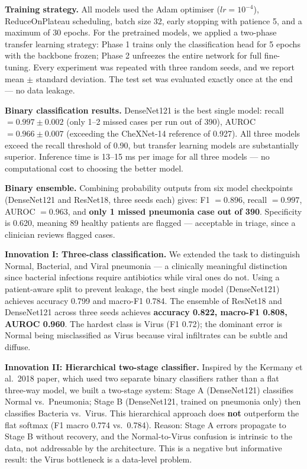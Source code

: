 \documentclass[12pt,a4paper]{article}
\begin{document}
\begin{tcolorbox}[sumbox={What This Project Is About — A Complete Overview}]
\medskip
\textbf{Training strategy.}
All models used the Adam optimiser ($lr=10^{-4}$), ReduceOnPlateau scheduling, batch size 32, early stopping with patience 5, and a maximum of 30 epochs. For the pretrained models, we applied a two-phase transfer learning strategy: Phase 1 trains only the classification head for 5 epochs with the backbone frozen; Phase 2 unfreezes the entire network for full fine-tuning. Every experiment was repeated with three random seeds, and we report mean $\pm$ standard deviation. The test set was evaluated exactly once at the end --- no data leakage.

\medskip
\textbf{Binary classification results.}
DenseNet121 is the best single model: recall $= 0.997 \pm 0.002$ (only 1--2 missed cases per run out of 390), AUROC $= 0.966 \pm 0.007$ (exceeding the CheXNet-14 reference of 0.927). All three models exceed the recall threshold of 0.90, but transfer learning models are substantially superior. Inference time is 13--15 ms per image for all three models --- no computational cost to choosing the better model.

\medskip
\textbf{Binary ensemble.}
Combining probability outputs from six model checkpoints (DenseNet121 and ResNet18, three seeds each) gives: F1 $= 0.896$, recall $= 0.997$, AUROC $= 0.963$, and \textbf{only 1 missed pneumonia case out of 390}. Specificity is 0.620, meaning 89 healthy patients are flagged --- acceptable in triage, since a clinician reviews flagged cases.

\medskip
\textbf{Innovation I: Three-class classification.}
We extended the task to distinguish Normal, Bacterial, and Viral pneumonia --- a clinically meaningful distinction since bacterial infections require antibiotics while viral ones do not. Using a patient-aware split to prevent leakage, the best single model (DenseNet121) achieves accuracy 0.799 and macro-F1 0.784. The ensemble of ResNet18 and DenseNet121 across three seeds achieves \textbf{accuracy 0.822, macro-F1 0.808, AUROC 0.960}. The hardest class is Virus (F1 0.72); the dominant error is Normal being misclassified as Virus because viral infiltrates can be subtle and diffuse.

\medskip
\textbf{Innovation II: Hierarchical two-stage classifier.}
Inspired by the Kermany et al.\ 2018 paper, which used two separate binary classifiers rather than a flat three-way model, we built a two-stage system: Stage A (DenseNet121) classifies Normal vs.\ Pneumonia; Stage B (DenseNet121, trained on pneumonia only) then classifies Bacteria vs.\ Virus. This hierarchical approach does \textbf{not} outperform the flat softmax (F1 macro 0.774 vs.\ 0.784). Reason: Stage A errors propagate to Stage B without recovery, and the Normal-to-Virus confusion is intrinsic to the data, not addressable by the architecture. This is a negative but informative result: the Virus bottleneck is a data-level problem.


\end{tcolorbox}
\end{document}
